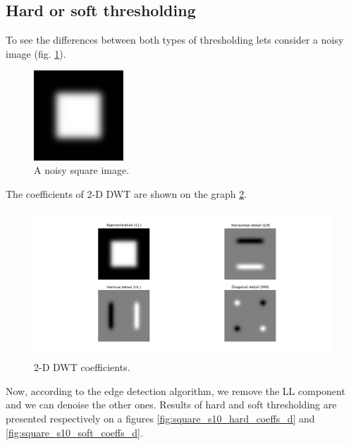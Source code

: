 \subsection{Hard or soft thresholding}

To see the differences between both types of thresholding lets consider a noisy image (fig. \ref{fig:square_s10}).

\begin{figure}[h]
	\centering
	\includegraphics[width=0.3\textwidth]{graphs/square_s10.png}
	\caption{A noisy square image.}
	\label{fig:square_s10}
\end{figure}

The coefficients of 2-D DWT are shown on the graph \ref{fig:square_s10_coeffs}.

\begin{figure}[h]
	\centering
	\includegraphics[width=\textwidth]{graphs/square_s10_db1_coeffs.png}
	\caption{2-D DWT coefficients.}
	\label{fig:square_s10_coeffs}
\end{figure}

Now, according to the edge detection algorithm, we remove the LL component and we can denoise the other ones. Results of hard and soft thresholding are presented respectively on a figures \ref{fig:square_s10_hard_coeffs_d} and \ref{fig:square_s10_soft_coeffs_d}.

